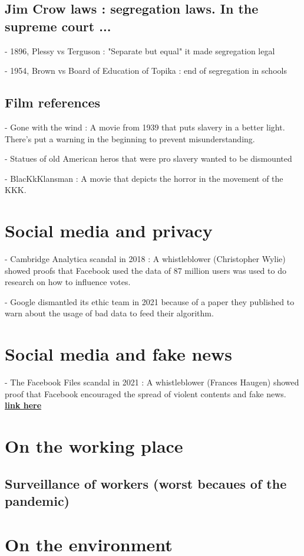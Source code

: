 \documentclass[10pt]{article}
\newcommand\unlien[2]{{\color{color1}\href{#1}{\textbf{#2}}}}
\begin{document}
\subsection*{Jim Crow laws : segregation laws. In the supreme court ...}

- 1896, Plessy vs Terguson : "Separate but equal" it made segregation legal

- 1954, Brown vs Board of Education of Topika : end of segregation in schools

\subsection*{Film references}

- Gone with the wind : A movie from 1939 that puts slavery in a better light. 
There's put a warning in the beginning to prevent misunderstanding.

- Statues of old American heros that were pro slavery wanted to be dismounted

- BlacKkKlansman : A movie that depicts the horror in the movement of the KKK.





\section*{Social media and privacy}

- Cambridge Analytica scandal in 2018 : A whistleblower (Christopher Wylie) 
showed proofs that Facebook used the data of 87 million users was used to do 
research on how to influence votes.

- Google dismantled its ethic team in 2021 because of a paper they published 
to warn about the usage of bad data to feed their algorithm.






\section*{Social media and fake news}

- The Facebook Files scandal in 2021 : A whistleblower (Frances Haugen) showed
proof that Facebook encouraged the spread of violent contents and fake news. 
\unlien{https://en.wikipedia.org/wiki/2021_Facebook_leak}{link here}





\section*{On the working place}

\subsection*{Surveillance of workers (worst becaues of the pandemic)}






\section*{On the environment}
\end{document}
